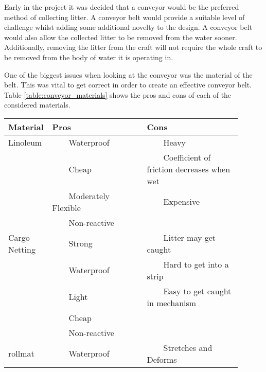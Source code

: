 \documentclass [12pt]{article}
\newcommand{\tabitem}{~~\llap{\textbullet}~~}
\begin{document}
Early in the project it was decided that a conveyor would be the preferred method of collecting litter. A conveyor belt would provide a suitable level of challenge whilst adding some additional novelty to the design. A conveyor belt would also allow the collected litter to be removed from the water sooner. Additionally, removing the litter from the craft will not require the whole craft to be removed from the body of water it is operating in. 

One of the biggest issues when looking at the conveyor was the material of the belt. This was vital to get correct in order to create an effective conveyor belt. Table \ref{table:conveyor_materials} shows the pros and cons of each of the considered materials. 

\begin{table}[H]
\centering
\setlength{\arrayrulewidth}{1.5pt}
\begin{tabular}{|p{0.1\linewidth}|p{0.4\linewidth}|p{0.4\linewidth}|}
\hline
\cellcolor{gray!40} Material & \cellcolor{gray!40}Pros & \cellcolor{gray!40} Cons \\ 
\hline
\cellcolor{gray!20} Linoleum & \cellcolor{gray!20} \tabitem Waterproof & \cellcolor{gray!20} \tabitem Heavy\\
\cellcolor{gray!20}  & \cellcolor{gray!20} \tabitem Cheap & \cellcolor{gray!20} \tabitem Coefficient of friction decreases when wet \\
\cellcolor{gray!20}  & \cellcolor{gray!20} \tabitem Moderately Flexible & \cellcolor{gray!20} \tabitem Expensive \\
\cellcolor{gray!20}  & \cellcolor{gray!20} \tabitem Non-reactive & \cellcolor{gray!20} \\
\hline
\cellcolor{gray!20} Cargo Netting & \cellcolor{gray!20} \tabitem Strong & \cellcolor{gray!20} \tabitem Litter may get caught\\
\cellcolor{gray!20}  & \cellcolor{gray!20} \tabitem Waterproof & \cellcolor{gray!20} \tabitem Hard to get into a strip \\
\cellcolor{gray!20}  & \cellcolor{gray!20} \tabitem Light & \cellcolor{gray!20} \tabitem Easy to get caught in mechanism \\
\cellcolor{gray!20}  & \cellcolor{gray!20} \tabitem Cheap & \cellcolor{gray!20} \\
\cellcolor{gray!20}  & \cellcolor{gray!20} \tabitem Non-reactive & \cellcolor{gray!20} \\
\hline
\cellcolor{gray!20} \gls{rollmat} & \cellcolor{gray!20} \tabitem Waterproof & \cellcolor{gray!20} \tabitem Stretches and Deforms\\

\end{tabular}
\end{table}
\end{document}
